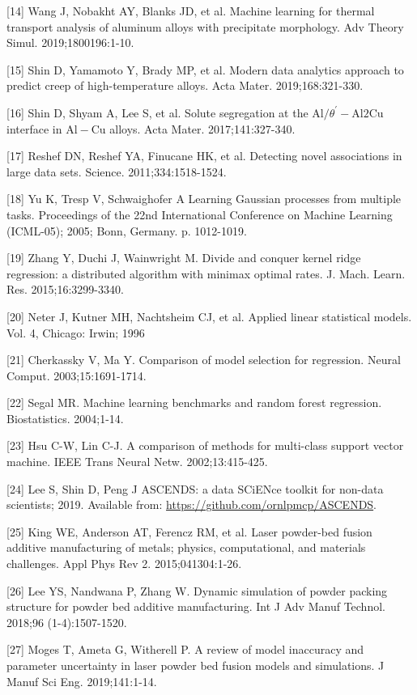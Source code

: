 \documentclass[10pt]{article}
\begin{document}
[14] Wang J, Nobakht AY, Blanks JD, et al. Machine learning for thermal transport analysis of aluminum alloys with precipitate morphology. Adv Theory Simul. 2019;1800196:1-10.

[15] Shin D, Yamamoto Y, Brady MP, et al. Modern data analytics approach to predict creep of high-temperature alloys. Acta Mater. 2019;168:321-330.

[16] Shin D, Shyam A, Lee S, et al. Solute segregation at the $\mathrm{Al} / \theta^{\prime}-\mathrm{Al} 2 \mathrm{Cu}$ interface in $\mathrm{Al}-\mathrm{Cu}$ alloys. Acta Mater. 2017;141:327-340.

[17] Reshef DN, Reshef YA, Finucane HK, et al. Detecting novel associations in large data sets. Science. 2011;334:1518-1524.

[18] Yu K, Tresp V, Schwaighofer A Learning Gaussian processes from multiple tasks. Proceedings of the 22nd International Conference on Machine Learning (ICML-05); 2005; Bonn, Germany. p. 1012-1019.

[19] Zhang Y, Duchi J, Wainwright M. Divide and conquer kernel ridge regression: a distributed algorithm with minimax optimal rates. J. Mach. Learn. Res. 2015;16:3299-3340.

[20] Neter J, Kutner MH, Nachtsheim CJ, et al. Applied linear statistical models. Vol. 4, Chicago: Irwin; 1996

[21] Cherkassky V, Ma Y. Comparison of model selection for regression. Neural Comput. 2003;15:1691-1714.

[22] Segal MR. Machine learning benchmarks and random forest regression. Biostatistics. 2004;1-14.

[23] Hsu C-W, Lin C-J. A comparison of methods for multi-class support vector machine. IEEE Trans Neural Netw. 2002;13:415-425.

[24] Lee S, Shin D, Peng J ASCENDS: a data SCiENce toolkit for non-data scientists; 2019. Available from: \href{https://github.com/ornlpmcp/ASCENDS}{https://github.com/ornlpmcp/ASCENDS}.

[25] King WE, Anderson AT, Ferencz RM, et al. Laser powder-bed fusion additive manufacturing of metals; physics, computational, and materials challenges. Appl Phys Rev 2. 2015;041304:1-26.

[26] Lee YS, Nandwana P, Zhang W. Dynamic simulation of powder packing structure for powder bed additive manufacturing. Int J Adv Manuf Technol. 2018;96 (1-4):1507-1520.

[27] Moges T, Ameta G, Witherell P. A review of model inaccuracy and parameter uncertainty in laser powder bed fusion models and simulations. J Manuf Sci Eng. 2019;141:1-14.
\end{document}
